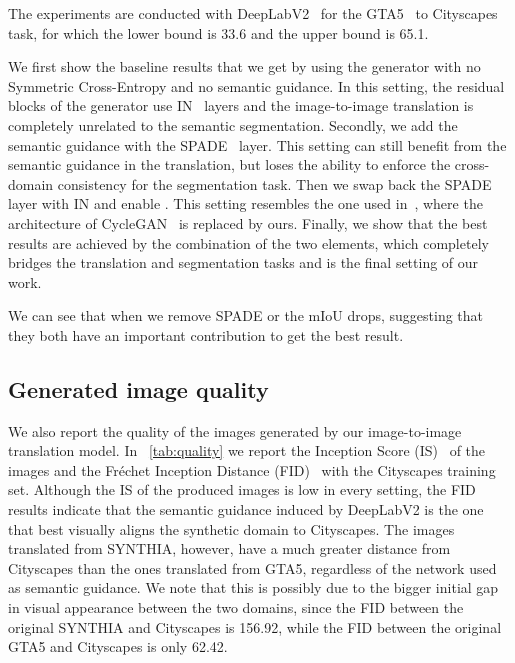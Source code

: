 \documentclass{bmvc2k}
\begin{document}
The experiments are conducted with DeepLabV2~\cite{deeplab} for the GTA5~\cite{gta} to Cityscapes~\cite{cityscapes} task, for which the lower bound is 33.6 and the upper bound is 65.1.

We first show the baseline results that we get by using the generator with no Symmetric Cross-Entropy  and no semantic guidance. In this setting, the residual blocks of the generator use IN~\cite{instancenorm} layers and the image-to-image translation is completely unrelated to the semantic segmentation. Secondly, we add the semantic guidance with the SPADE~\cite{spade} layer. This setting can still benefit from the semantic guidance in the translation, but loses the ability to enforce the cross-domain consistency for the segmentation task. Then we swap back the SPADE layer with IN and enable . This setting resembles the one used in~\cite{crdoco}, where the architecture of CycleGAN~\cite{cyclegan} is replaced by ours. Finally, we show that the best results are achieved by the combination of the two elements, which completely bridges the translation and segmentation tasks and is the final setting of our work.

We can see that when we remove SPADE or  the mIoU drops, suggesting that they both have an important contribution to get the best result.

\subsection{Generated image quality}
We also report the quality of the images generated by our image-to-image translation model. In \tablename~\ref{tab:quality} we report the Inception Score (IS)~\cite{inception-score} of the images  and the Fr\'echet Inception Distance (FID)~\cite{ttur} with the Cityscapes training set. Although the IS of the produced images is low in every setting, the FID results indicate that the semantic guidance induced by DeepLabV2 is the one that best visually aligns the synthetic domain to Cityscapes. The images translated from SYNTHIA, however, have a much greater distance from Cityscapes than the ones translated from GTA5, regardless of the network used as semantic guidance. We note that this is possibly due to the bigger initial gap in visual appearance between the two domains, since the FID between the original SYNTHIA and Cityscapes is 156.92, while the FID between the original GTA5 and Cityscapes is only 62.42.
\end{document}
